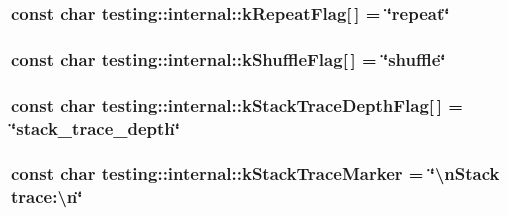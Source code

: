 \subsubsection[{\texorpdfstring{k\+Repeat\+Flag}{kRepeatFlag}}]{\setlength{\rightskip}{0pt plus 5cm}const char testing\+::internal\+::k\+Repeat\+Flag\mbox{[}$\,$\mbox{]} = \char`\"{}repeat\char`\"{}}\hypertarget{namespacetesting_1_1internal_a764ee423d39ebb8e10c53ab9b685cd9b}{}\label{namespacetesting_1_1internal_a764ee423d39ebb8e10c53ab9b685cd9b}
\subsubsection[{\texorpdfstring{k\+Shuffle\+Flag}{kShuffleFlag}}]{\setlength{\rightskip}{0pt plus 5cm}const char testing\+::internal\+::k\+Shuffle\+Flag\mbox{[}$\,$\mbox{]} = \char`\"{}shuffle\char`\"{}}\hypertarget{namespacetesting_1_1internal_affd2c1118505cb97d8ff728c95fc722b}{}\label{namespacetesting_1_1internal_affd2c1118505cb97d8ff728c95fc722b}
\subsubsection[{\texorpdfstring{k\+Stack\+Trace\+Depth\+Flag}{kStackTraceDepthFlag}}]{\setlength{\rightskip}{0pt plus 5cm}const char testing\+::internal\+::k\+Stack\+Trace\+Depth\+Flag\mbox{[}$\,$\mbox{]} = \char`\"{}stack\+\_\+trace\+\_\+depth\char`\"{}}\hypertarget{namespacetesting_1_1internal_ad6f90e66d431ca3a9084408878c2cc77}{}\label{namespacetesting_1_1internal_ad6f90e66d431ca3a9084408878c2cc77}
\subsubsection[{\texorpdfstring{k\+Stack\+Trace\+Marker}{kStackTraceMarker}}]{\setlength{\rightskip}{0pt plus 5cm}const char testing\+::internal\+::k\+Stack\+Trace\+Marker = \char`\"{}\textbackslash{}n\+Stack trace\+:\textbackslash{}n\char`\"{}}\hypertarget{namespacetesting_1_1internal_abb38528ca6a45df265b19f5ccb3d16d9}{}\label{namespacetesting_1_1internal_abb38528ca6a45df265b19f5ccb3d16d9}
